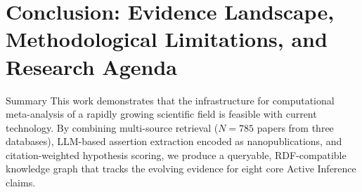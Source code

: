 \documentclass[
  ignorenonframetext,
]{beamer}
\author{\texorpdfstring{}{}}
\date{}
\begin{document}
\section{\texorpdfstring{Conclusion: Evidence Landscape, Methodological
Limitations, and Research Agenda
\label{sec:conclusion}}{Conclusion: Evidence Landscape, Methodological Limitations, and Research Agenda }}\label{conclusion-evidence-landscape-methodological-limitations-and-research-agenda}

\begin{frame}{Summary}
\protect{}\label{summary}
This work demonstrates that the infrastructure for computational
meta-analysis of a rapidly growing scientific field is feasible with
current technology. By combining multi-source retrieval (\(N = 785\)
papers from three databases), LLM-based assertion extraction encoded as
nanopublications, and citation-weighted hypothesis scoring, we produce a
queryable, RDF-compatible knowledge graph that tracks the evolving
evidence for eight core Active Inference claims.
\end{frame}
\end{document}
